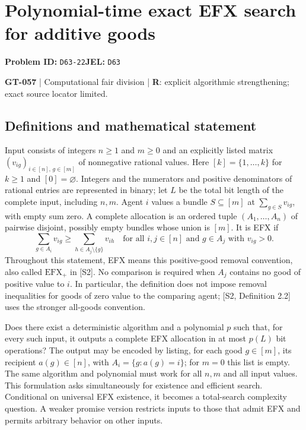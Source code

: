 \documentclass[11pt,a4paper]{article}
\begin{document}
\section*{Polynomial-time exact EFX search for additive goods}
\textbf{Problem ID:} \texttt{D63-22}\quad \textbf{JEL:} \texttt{D63}\par
\label{problem:OP-0187}
\label{game:GT-057}
{\sffamily\small\color{muted}
\textbf{GT-057} | Computational fair division | \textbf{R}: explicit algorithmic strengthening; exact source locator limited.
\par}
\subsection*{Definitions and mathematical statement}
Input consists of integers $n\geq 1$ and $m\geq 0$ and an explicitly listed matrix $(v_{ig})_{i\in[n],\,g\in[m]}$ of nonnegative rational values. Here $[k]=\{1,\ldots,k\}$ for $k\geq 1$ and $[0]=\varnothing$. Integers and the numerators and positive denominators of rational entries are represented in binary; let $L$ be the total bit length of the complete input, including $n,m$. Agent $i$ values a bundle $S\subseteq[m]$ at $\sum_{g\in S}v_{ig}$, with empty sum zero. A complete allocation is an ordered tuple $(A_1,\ldots,A_n)$ of pairwise disjoint, possibly empty bundles whose union is $[m]$. It is EFX if
\[
 \sum_{g\in A_i}v_{ig}\geq
 \sum_{h\in A_j\setminus\{g\}}v_{ih}
 \quad\text{for all }i,j\in[n]\text{ and }g\in A_j\text{ with }v_{ig}>0.
\]
Throughout this statement, EFX means this positive-good removal convention, also called $\mathrm{EFX}_{+}$ in [S2]. No comparison is required when $A_j$ contains no good of positive value to $i$. In particular, the definition does not impose removal inequalities for goods of zero value to the comparing agent; [S2, Definition 2.2] uses the stronger all-goods convention.

Does there exist a deterministic algorithm and a polynomial $p$ such that, for every such input, it outputs a complete EFX allocation in at most $p(L)$ bit operations? The output may be encoded by listing, for each good $g\in[m]$, its recipient $a(g)\in[n]$, with $A_i=\{g:a(g)=i\}$; for $m=0$ this list is empty. The same algorithm and polynomial must work for all $n,m$ and all input values. This formulation asks simultaneously for existence and efficient search. Conditional on universal EFX existence, it becomes a total-search complexity question. A weaker promise version restricts inputs to those that admit EFX and permits arbitrary behavior on other inputs.
\end{document}
